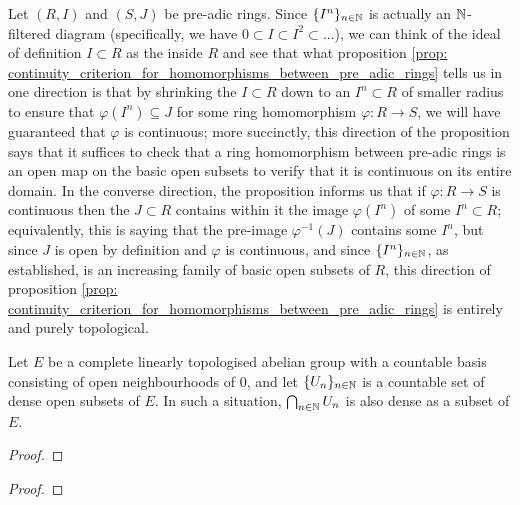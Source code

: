             \begin{remark}
                Let $(R, I)$ and $(S, J)$ be pre-adic rings. Since $\{I^n\}_{n \in \mathbb{N}}$ is actually an $\mathbb{N}$-filtered diagram (specifically, we have $0 \subset I \subset I^2 \subset ...$), we can think of the ideal of definition $I \subset R$ as the  inside $R$ and see that what proposition \ref{prop: continuity_criterion_for_homomorphisms_between_pre_adic_rings} tells us in one direction is that by shrinking the  $I \subset R$ down to an  $I^n \subset R$ of smaller radius to ensure that $\varphi(I^n) \subseteq J$ for some ring homomorphism $\varphi: R \to S$, we will have guaranteed that $\varphi$ is continuous; more succinctly, this direction of the proposition says that it suffices to check that a ring homomorphism between pre-adic rings is an open map on the basic open subsets to verify that it is continuous on its entire domain. In the converse direction, the proposition informs us that if $\varphi: R \to S$ is continuous then the  $J \subset R$ contains within it the image $\varphi(I^n)$ of some  $I^n \subset R$; equivalently, this is saying that the pre-image $\varphi^{-1}(J)$ contains some $I^n$, but since $J$ is open by definition and $\varphi$ is continuous, and since $\{I^n\}_{n \in \mathbb{N}}$, as established, is an increasing family of basic open subsets of $R$, this direction of proposition \ref{prop: continuity_criterion_for_homomorphisms_between_pre_adic_rings} is entirely and purely topological.
            \end{remark}
            \begin{lemma} \label{lemma: baire_category_theorem}
                Let $E$ be a complete linearly topologised abelian group with a countable basis consisting of open neighbourhoods of $0$, and let $\{U_n\}_{n \in \mathbb{N}}$ is a countable set of dense open subsets of $E$. In such a situation, $\bigcap_{n \in \mathbb{N}} U_n$ is also dense as a subset of $E$.
            \end{lemma}
                \begin{proof}
                    
                \end{proof}
            \begin{proposition} \label{prop: open_mapping_lemma}
                
            \end{proposition}
                \begin{proof}
                    
                \end{proof}
                
